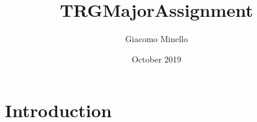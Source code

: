 \documentclass{article}
\title{TRGMajorAssignment}
\author{Giacomo Minello}
\date{October 2019}
\begin{document}
\maketitle

\section{Introduction}
\end{document}
